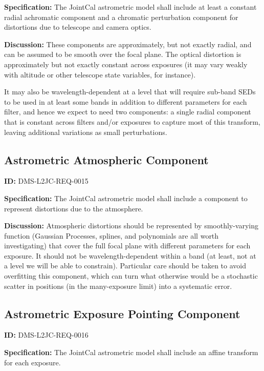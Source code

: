 \documentclass[SE,toc,lsstdraft]{lsstdoc}
\begin{document}
\textbf{Specification:}
The JointCal astrometric model shall include at least a constant radial achromatic component and a chromatic perturbation component for distortions due to telescope and camera optics.

\textbf{Discussion:}
These components are approximately, but not exactly radial, and can be assumed to be smooth over the focal plane.  The optical distortion is approximately but not exactly constant across exposures (it may vary weakly with altitude or other telescope state variables, for instance).

It may also be wavelength-dependent at a level that will require sub-band SEDs to be used in at least some bands in addition to different parameters for each filter, and hence we expect to need two components: a single radial component that is constant across filters and/or exposures to capture most of this transform, leaving additional variations as small perturbations.

\subsection{Astrometric Atmospheric Component}

\label{DMS-L2JC-REQ-0015}
\textbf{ID:} DMS-L2JC-REQ-0015

\textbf{Specification:}
The JointCal astrometric model shall include a component to represent distortions due to the atmosphere.

\textbf{Discussion:}
Atmospheric distortions should be represented by smoothly-varying function (Gaussian Processes, splines, and polynomials are all worth investigating) that cover the full focal plane with different parameters for each exposure.  It should not be wavelength-dependent within a band (at least, not at a level we will be able to constrain).  Particular care should be taken to avoid overfitting this component, which can turn what otherwise would be a stochastic scatter in positions (in the many-exposure limit) into a systematic error.

\subsection{Astrometric Exposure Pointing Component}

\label{DMS-L2JC-REQ-0016}
\textbf{ID:} DMS-L2JC-REQ-0016

\textbf{Specification:}
The JointCal astrometric model shall include an affine transform for each exposure.
\end{document}
